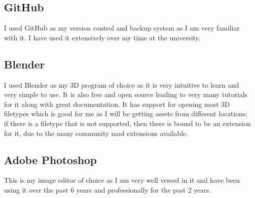 \documentclass[10pt]{report}
\begin{document}
\subsection{GitHub}
I used GitHub as my version control and backup system as I am very familiar with it. I have used it extensively over my time at the university.

\subsection{Blender}
I used Blender as my 3D program of choice as it is very intuitive to learn and very simple to use. It is also free and open source leading to very many tutorials for it along with great documentation. It has support for opening most 3D filetypes which is good for me as I will be getting assets from different locations; if there is a filetype that is not supported, then there is bound to be an extension for it, due to the many community mad extensions available.

\subsection{Adobe Photoshop}
This is my image editor of choice as I am very well versed in it and have been using it over the past 6 years and professionally for the past 2 years.

\subsection{}
\end{document}

